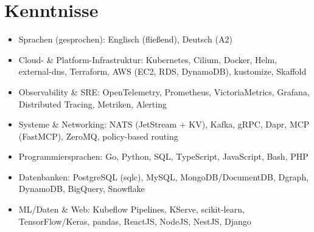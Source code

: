 \documentclass[10pt,a4paper]{resume}
\begin{document}
\section{Kenntnisse}

\begin{itemize}[leftmargin=1.4em,nosep,topsep=2pt]
  \item Sprachen (gesprochen): Englisch (fließend), Deutsch (A2)
  \item Cloud- \& Platform-Infrastruktur: Kubernetes, Cilium, Docker, Helm, external-dns, Terraform, AWS (EC2, RDS, DynamoDB), kustomize, Skaffold
  \item Observability \& SRE: OpenTelemetry, Prometheus, VictoriaMetrics, Grafana, Distributed Tracing, Metriken, Alerting
  \item Systeme \& Networking: NATS (JetStream + KV), Kafka, gRPC, Dapr, MCP (FastMCP), ZeroMQ, policy-based routing
  \item Programmiersprachen: Go, Python, SQL, TypeScript, JavaScript, Bash, PHP
  \item Datenbanken: PostgreSQL (sqlc), MySQL, MongoDB/DocumentDB, Dgraph, DynamoDB, BigQuery, Snowflake
  \item ML/Daten \& Web: Kubeflow Pipelines, KServe, scikit-learn, TensorFlow/Keras, pandas, ReactJS, NodeJS, NestJS, Django
\end{itemize}
\end{document}
